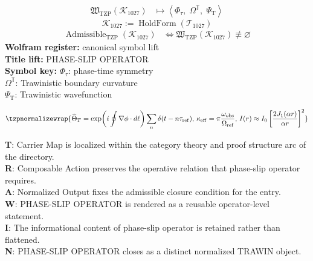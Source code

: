 \noindent
\begin{minipage}[t]{0.48\linewidth}
\begingroup
\small
\[
\begin{aligned}
\mathfrak{W}_{\mathrm{TZP}}\!\left(\mathcal{K}_{1027}\right)
&\longmapsto
\left\langle \Phi_{\tau},\; \Omega^{\mathbb{T}},\; \Psi_{\mathrm{T}} \right\rangle
\end{aligned}
\]
\[
\mathcal{K}_{1027}
:=
\operatorname{HoldForm}\!\left(\mathcal{T}_{1027}\right)
\]
\[
\begin{aligned}
\operatorname{Admissible}_{\mathrm{TZP}}\!\left(\mathcal{K}_{1027}\right)
&\Longleftrightarrow
\mathfrak{W}_{\mathrm{TZP}}\!\left(\mathcal{K}_{1027}\right)\not\equiv\varnothing
\end{aligned}
\]
\textbf{Wolfram register:} canonical symbol lift\\
\textbf{Title lift:} PHASE-SLIP OPERATOR\\
\textbf{Symbol key:} \(\Phi_{\tau}\): phase-time symmetry\\ \(\Omega^{\mathbb{T}}\): Trawinistic boundary curvature\\ \(\Psi_{\mathrm{T}}\): Trawinistic wavefunction
\par
\endgroup
\end{minipage}\hfill
\begin{minipage}[t]{0.48\linewidth}
\[
\tzpnormalizewrap{\widehat{\Theta}_{T}=\exp\!\left(i\oint\nabla\phi\cdot d\ell\right)\sum_n\delta(t-n\tau_{\mathrm{ref}}),\,\kappa_{\mathrm{eff}}=\pi\frac{\omega_{\mathrm{obs}}}{\Omega_{\mathrm{ref}}},\,I(r)\approx I_0\left[\frac{2J_1(\alpha r)}{\alpha r}\right]^2}
\]

\small
\textbf{T}: Carrier Map is localized within the category theory and proof structure arc of the directory.\\
\textbf{R}: Composable Action preserves the operative relation that phase-slip operator requires.\\
\textbf{A}: Normalized Output fixes the admissible closure condition for the entry.\\
\textbf{W}: PHASE-SLIP OPERATOR is rendered as a reusable operator-level statement.\\
\textbf{I}: The informational content of phase-slip operator is retained rather than flattened.\\
\textbf{N}: PHASE-SLIP OPERATOR closes as a distinct normalized TRAWIN object.
\normalsize
\end{minipage}

